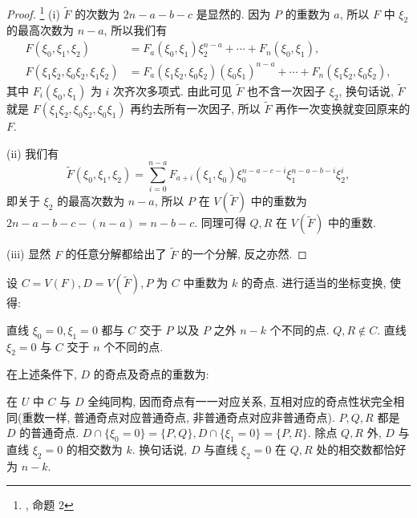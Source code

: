 \begin{proof}
\footnote{\cite{notes}, 命题 2} (i) $\tilde{F}$ 的次数为 $2n-a-b-c$ 是显然的.
因为 $P$ 的重数为 $a$,
所以 $F$ 中 $\xi_2$ 的最高次数为 $n-a$, 所以我们有
\begin{align*}
F(\xi_0,\xi_1,\xi_2) &= F_a(\xi_0,\xi_1)\xi_2^{n-a} + \cdots + F_{n}(\xi_0,\xi_1),\\
F(\xi_1\xi_2,\xi_0\xi_2,\xi_1\xi_2) &= F_a(\xi_1\xi_2,\xi_0\xi_2)(\xi_0\xi_1)^{n-a} + \cdots + F_{n}(\xi_1\xi_2,\xi_0\xi_2),
\end{align*}
其中 $F_i(\xi_0,\xi_1)$ 为 $i$ 次齐次多项式.
由此可见 $\tilde{F}$ 也不含一次因子 $\xi_2$,
换句话说, $\tilde{F}$ 就是 $F(\xi_1\xi_2,\xi_0\xi_2,\xi_0\xi_1)$ 再约去所有一次因子,
所以 $\tilde{F}$ 再作一次变换就变回原来的 $F$.

(ii) 我们有
\[\tilde{F}(\xi_0,\xi_1,\xi_2) = \sum_{i=0}^{n-a}F_{a+i}(\xi_1,\xi_0)\xi_0^{n-a-c-i}\xi_1^{n-a-b-i}\xi_2^i,\]
即关于 $\xi_2$ 的最高次数为 $n-a$,
所以 $P$ 在 $V(\tilde{F})$ 中的重数为 $2n-a-b-c-(n-a) = n-b-c$.
同理可得 $Q,R$ 在 $V(\tilde{F})$ 中的重数.

(iii) 显然 $F$ 的任意分解都给出了 $\tilde{F}$ 的一个分解, 反之亦然.
\end{proof}

设 $C = V(F), D = V(\tilde{F}), P$ 为 $C$ 中重数为 $k$ 的奇点.
进行适当的坐标变换, 使得:
\begin{enumerate}[label=(\alph*)]
    \ii 直线 $\xi_0 = 0, \xi_1 = 0$ 都与 $C$ 交于 $P$ 以及 $P$ 之外 $n-k$ 个不同的点.
    \ii $Q,R \notin C$.
    \ii 直线 $\xi_2 = 0$ 与 $C$ 交于 $n$ 个不同的点.
\end{enumerate}

\begin{lem}
\label{lem:singularity-become-ordinary}
在上述条件下, $D$ 的奇点及奇点的重数为:
\begin{enumerate}[label=\normalfont(\roman*)]
    \ii 在 $U$ 中 $C$ 与 $D$ 全纯同构, 因而奇点有一一对应关系,
    互相对应的奇点性状完全相同(重数一样, 普通奇点对应普通奇点, 非普通奇点对应非普通奇点).
    \ii $P,Q,R$ 都是 $D$ 的普通奇点.
    \ii $D\cap \{\xi_0 = 0\} = \{P,Q\}, D\cap \{\xi_1 = 0\} = \{P,R\}$.
    \ii 除点 $Q,R$ 外, $D$ 与直线 $\xi_2 = 0$ 的相交数为 $k$.
    换句话说, $D$ 与直线 $\xi_2 = 0$ 在 $Q,R$ 处的相交数都恰好为 $n-k$.
\end{enumerate}
\end{lem}

